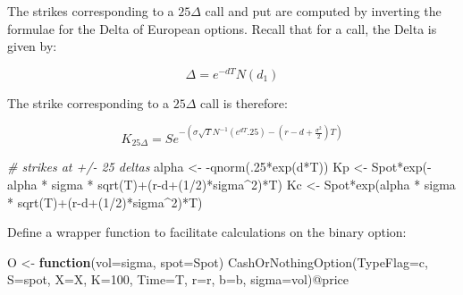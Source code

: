 \documentclass[]{tufte-book}
\newenvironment{Shaded}{}{}
\newcommand{\AttributeTok}[1]{\textcolor[rgb]{0.49,0.56,0.16}{#1}}
\newcommand{\CommentTok}[1]{\textcolor[rgb]{0.38,0.63,0.69}{\textit{#1}}}
\newcommand{\ControlFlowTok}[1]{\textcolor[rgb]{0.00,0.44,0.13}{\textbf{#1}}}
\newcommand{\DecValTok}[1]{\textcolor[rgb]{0.25,0.63,0.44}{#1}}
\newcommand{\FunctionTok}[1]{\textcolor[rgb]{0.02,0.16,0.49}{#1}}
\newcommand{\NormalTok}[1]{#1}
\newcommand{\OtherTok}[1]{\textcolor[rgb]{0.00,0.44,0.13}{#1}}
\newcommand{\SpecialCharTok}[1]{\textcolor[rgb]{0.25,0.44,0.63}{#1}}
\newcommand{\StringTok}[1]{\textcolor[rgb]{0.25,0.44,0.63}{#1}}
\begin{document}
The strikes corresponding to a \(25\Delta\) call and put are computed by
inverting the formulae for the Delta of European options. Recall that
for a call, the Delta is given by:

\[\Delta = e^{-dT} N(d_1)\]

The strike corresponding to a \(25\Delta\) call is therefore:

\[K_{25\Delta} = S e^{- \left( \sigma \sqrt{T} N^{-1}(e^{dT}.25) -(r-d+\frac{\sigma^2}{2})T \right)}\]

\begin{Shaded}
\begin{Highlighting}[]
  \CommentTok{\# strikes at +/{-} 25 deltas}
\NormalTok{  alpha }\OtherTok{\textless{}{-}} \SpecialCharTok{{-}}\FunctionTok{qnorm}\NormalTok{(.}\DecValTok{25}\SpecialCharTok{*}\FunctionTok{exp}\NormalTok{(d}\SpecialCharTok{*}\NormalTok{T))}
\NormalTok{  Kp }\OtherTok{\textless{}{-}}\NormalTok{ Spot}\SpecialCharTok{*}\FunctionTok{exp}\NormalTok{(}\SpecialCharTok{{-}}\NormalTok{alpha }\SpecialCharTok{*}\NormalTok{ sigma }\SpecialCharTok{*} \FunctionTok{sqrt}\NormalTok{(T)}\SpecialCharTok{+}\NormalTok{(r}\SpecialCharTok{{-}}\NormalTok{d}\SpecialCharTok{+}\NormalTok{(}\DecValTok{1}\SpecialCharTok{/}\DecValTok{2}\NormalTok{)}\SpecialCharTok{*}\NormalTok{sigma}\SpecialCharTok{\^{}}\DecValTok{2}\NormalTok{)}\SpecialCharTok{*}\NormalTok{T)}
\NormalTok{  Kc }\OtherTok{\textless{}{-}}\NormalTok{ Spot}\SpecialCharTok{*}\FunctionTok{exp}\NormalTok{(alpha }\SpecialCharTok{*}\NormalTok{ sigma }\SpecialCharTok{*} \FunctionTok{sqrt}\NormalTok{(T)}\SpecialCharTok{+}\NormalTok{(r}\SpecialCharTok{{-}}\NormalTok{d}\SpecialCharTok{+}\NormalTok{(}\DecValTok{1}\SpecialCharTok{/}\DecValTok{2}\NormalTok{)}\SpecialCharTok{*}\NormalTok{sigma}\SpecialCharTok{\^{}}\DecValTok{2}\NormalTok{)}\SpecialCharTok{*}\NormalTok{T)}
\end{Highlighting}
\end{Shaded}

Define a wrapper function to facilitate calculations on the binary
option:

\begin{Shaded}
\begin{Highlighting}[]
\NormalTok{  O }\OtherTok{\textless{}{-}} \ControlFlowTok{function}\NormalTok{(}\AttributeTok{vol=}\NormalTok{sigma, }\AttributeTok{spot=}\NormalTok{Spot) }\FunctionTok{CashOrNothingOption}\NormalTok{(}\AttributeTok{TypeFlag=}\StringTok{\textquotesingle{}c\textquotesingle{}}\NormalTok{, }\AttributeTok{S=}\NormalTok{spot,}
       \AttributeTok{X=}\NormalTok{X, }\AttributeTok{K=}\DecValTok{100}\NormalTok{, }\AttributeTok{Time=}\NormalTok{T, }\AttributeTok{r=}\NormalTok{r, }\AttributeTok{b=}\NormalTok{b, }\AttributeTok{sigma=}\NormalTok{vol)}\SpecialCharTok{@}\NormalTok{price}
\end{Highlighting}
\end{Shaded}
\end{document}
